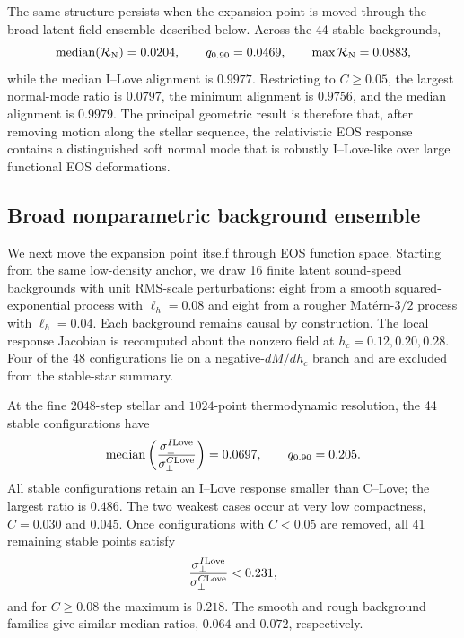The same structure persists when the expansion point is moved through the
broad latent-field ensemble described below.  Across the 44 stable
backgrounds,
\begin{equation}
    {\rm median}(\mathcal R_{\rm N})=0.0204,
    \qquad
    q_{0.90}=0.0469,
    \qquad
    \max\mathcal R_{\rm N}=0.0883,
    \label{eq:broad-normal-spectrum}
\end{equation}
while the median I--Love alignment is \(0.9977\).  Restricting to
\(C\ge0.05\), the largest normal-mode ratio is \(0.0797\), the minimum
alignment is \(0.9756\), and the median alignment is \(0.9979\).
The principal geometric result is therefore that, after removing motion
along the stellar sequence, the relativistic EOS response contains a
distinguished soft normal mode that is robustly I--Love-like over large
functional EOS deformations.



\subsection{Broad nonparametric background ensemble}

We next move the expansion point itself through EOS function space.  Starting
from the same low-density anchor, we draw 16 finite latent sound-speed
backgrounds with unit RMS-scale perturbations: eight from a smooth
squared-exponential process with \(\ell_h=0.08\) and eight from a rougher
Mat\'ern-\(3/2\) process with \(\ell_h=0.04\).  Each background remains causal
by construction.  The local response Jacobian is recomputed about the
nonzero field at \(h_c=0.12,0.20,0.28\).  Four of the 48 configurations lie
on a negative-\(dM/dh_c\) branch and are excluded from the stable-star
summary.

At the fine \(2048\)-step stellar and \(1024\)-point thermodynamic
resolution, the 44 stable configurations have
\begin{equation}
 {\rm median}\left(
 \frac{\sigma_\perp^{I{\rm Love}}}
      {\sigma_\perp^{C{\rm Love}}}
 \right)=0.0697,
 \qquad
 q_{0.90}=0.205.
 \label{eq:broad-summary}
\end{equation}
All stable configurations retain an I--Love response smaller than C--Love;
the largest ratio is \(0.486\).  The two weakest cases occur at very low
compactness, \(C=0.030\) and \(0.045\).  Once configurations with
\(C<0.05\) are removed, all 41 remaining stable points satisfy
\begin{equation}
 \frac{\sigma_\perp^{I{\rm Love}}}
      {\sigma_\perp^{C{\rm Love}}}
 <0.231,
\end{equation}
and for \(C\ge0.08\) the maximum is \(0.218\).  The smooth and rough
background families give similar median ratios, \(0.064\) and \(0.072\),
respectively.

